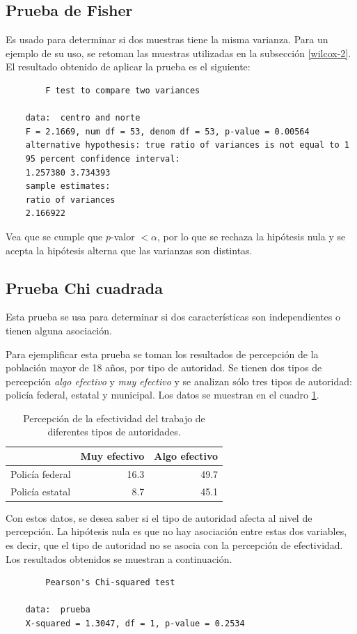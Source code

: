 \documentclass[12pt]{article}
\begin{document}
	\subsection{Prueba de Fisher}
	
	Es usado para determinar si dos muestras tiene la misma varianza. Para un ejemplo de su uso, se retoman las muestras utilizadas en la subsección \ref{wilcox-2}. El resultado obtenido de aplicar la prueba es el siguiente:
	\begin{verbatim}
		F test to compare two variances
	
	data:  centro and norte
	F = 2.1669, num df = 53, denom df = 53, p-value = 0.00564
	alternative hypothesis: true ratio of variances is not equal to 1
	95 percent confidence interval:
	1.257380 3.734393
	sample estimates:
	ratio of variances 
	2.166922 
	\end{verbatim}

	Vea que se cumple que $p$-valor $< \alpha$, por lo que se rechaza la hipótesis nula y se acepta la hipótesis alterna que las varianzas son distintas.
	
	\subsection{Prueba Chi cuadrada}
	
	Esta prueba se usa para determinar si dos características son independientes o tienen alguna asociación. 
	
	Para ejemplificar esta prueba se toman los resultados de percepción de la población mayor de 18 años, por tipo de autoridad. Se tienen dos tipos de percepción {\em algo efectivo} y {\em muy efectivo} y se analizan sólo tres tipos de autoridad: policía federal, estatal y municipal. Los datos se muestran en el cuadro \ref{dtaos-chi}.
	
	\begin{table}
		\centering
		\caption{Percepción de la efectividad del trabajo de diferentes tipos de autoridades.}
		\label{dtaos-chi}
		\begin{tabular}{lrr}
			\hline
			 & Muy efectivo & Algo efectivo\\
			\hline
			Policía federal & 16.3 & 49.7 \\
			Policía estatal & 8.7 & 45.1 \\
			\hline
		\end{tabular}
	\end{table}
	
	Con estos datos, se desea saber si el tipo de autoridad afecta al nivel de percepción. La hipótesis nula es que no hay asociación entre estas dos variables, es decir, que el tipo de autoridad no se asocia con la percepción de efectividad. Los resultados obtenidos se muestran a continuación.
	\begin{verbatim}
		Pearson's Chi-squared test

	data:  prueba
	X-squared = 1.3047, df = 1, p-value = 0.2534
	\end{verbatim}
	
\end{document}
